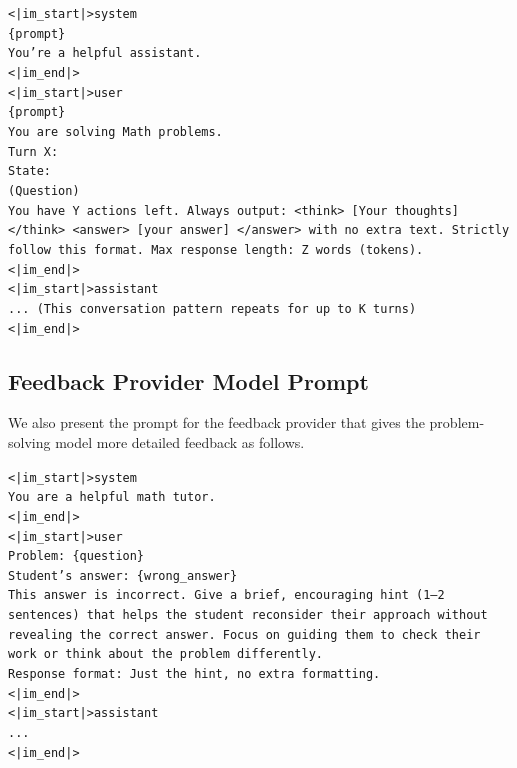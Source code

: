 \begin{tcolorbox}[breakable, colback=gray!2, colframe=black, boxrule=0.5pt, arc=2pt, width=\linewidth, title=Box 1: Model Prompt Template]
\label{box:prompt}
\texttt{<|im\_start|>system\\
\{prompt\}\\
You're a helpful assistant.\\
<|im\_end|>\\
<|im\_start|>user\\
\{prompt\}\\
You are solving Math problems.\\
Turn X:\\
State:\\
(Question)\\
You have Y actions left. Always output: <think> [Your thoughts] </think> <answer> [your answer] </answer> with no extra text. Strictly follow this format. Max response length: Z words (tokens).\\
<|im\_end|>\\
<|im\_start|>assistant\\
... (This conversation pattern repeats for up to K turns) \\
<|im\_end|>
}\par
\end{tcolorbox}


\subsection{Feedback Provider Model Prompt}
We also present the prompt for the feedback provider that gives the problem-solving model more detailed feedback as follows.

\begin{tcolorbox}[breakable, colback=gray!2, colframe=black, boxrule=0.5pt, arc=2pt, width=\linewidth, title=Box 2: Tutor Prompt Template]
\label{box:tutorprompt}
\texttt{<|im\_start|>system\\
You are a helpful math tutor.\\
<|im\_end|>\\
<|im\_start|>user\\
Problem: \{question\}\\
Student's answer: \{wrong\_answer\}\\
This answer is incorrect. Give a brief, encouraging hint (1--2 sentences) that helps the student reconsider their approach without revealing the correct answer. Focus on guiding them to check their work or think about the problem differently.\\
Response format: Just the hint, no extra formatting.\\
<|im\_end|>\\
<|im\_start|>assistant\\
...\\
<|im\_end|>}
\end{tcolorbox}

